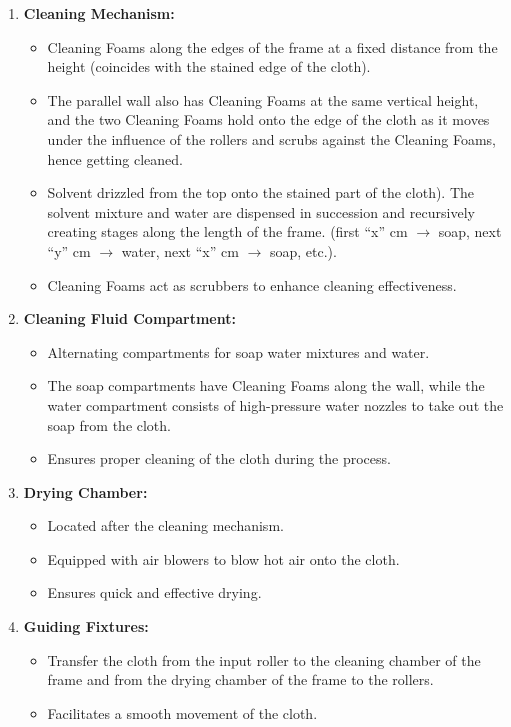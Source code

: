 \documentclass[table,french,english]{rapportCS}
\begin{document}
\begin{enumerate}[label=\arabic*.]
    \item \textbf{Cleaning Mechanism:}
    \begin{itemize}[label=$\bullet$]
        \item Cleaning Foams along the edges of the frame at a fixed distance from the height (coincides with the stained edge of the cloth).
        \item The parallel wall also has Cleaning Foams at the same vertical height, and the two Cleaning Foams hold onto the edge of the cloth as it moves under the influence of the rollers and scrubs against the Cleaning Foams, hence getting cleaned.
        \item Solvent drizzled from the top onto the stained part of the cloth). The solvent mixture and water are dispensed in succession and recursively creating stages along the length of the frame. (first “x” cm  $\rightarrow$  soap, next “y” cm $\rightarrow$ water, next “x” cm $\rightarrow$  soap, etc.).
        \item Cleaning Foams act as scrubbers to enhance cleaning effectiveness.
    \end{itemize}

    \item \textbf{Cleaning Fluid Compartment:}
    \begin{itemize}[label=$\bullet$]
        \item Alternating compartments for soap water mixtures and water.
        \item The soap compartments have Cleaning Foams along the wall, while the water compartment consists of high-pressure water nozzles to take out the soap from the cloth.
        \item Ensures proper cleaning of the cloth during the process.
    \end{itemize}

    \item \textbf{Drying Chamber:}
    \begin{itemize}[label=$\bullet$]
        \item Located after the cleaning mechanism.
        \item Equipped with air blowers  to blow hot air onto the cloth.
        \item Ensures quick and effective drying.
    \end{itemize}

    \item \textbf{Guiding Fixtures:}
    \begin{itemize}[label=$\bullet$]
        \item Transfer the cloth from the input roller to the cleaning chamber of the frame and from the drying chamber of the frame to the rollers.
        \item Facilitates a smooth movement of the cloth.
    \end{itemize}


\end{enumerate}
\end{document}
